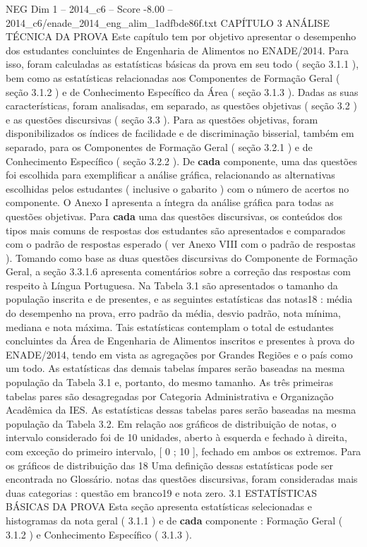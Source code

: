 \begin{textsample}{NEG Dim 1 – 2014\_c6 – Score -8.00 – 2014\_c6/enade\_2014\_eng\_alim\_1adfbde86f.txt}  \label{ex:f1_neg_020}
CAPÍTULO 3 ANÁLISE TÉCNICA DA PROVA Este capítulo tem por objetivo apresentar o desempenho dos estudantes concluintes de Engenharia de Alimentos no ENADE/2014.
Para isso, foram calculadas as estatísticas básicas da prova em seu todo ( seção 3.1.1 ), bem como as estatísticas relacionadas aos Componentes de Formação Geral ( seção 3.1.2 ) e de Conhecimento Específico da Área ( seção 3.1.3 ).
Dadas as suas características, foram analisadas, em separado, as questões objetivas ( seção 3.2 ) e as questões discursivas ( seção 3.3 ).
Para as questões objetivas, foram disponibilizados os índices de facilidade e de discriminação bisserial, também em separado, para os Componentes de Formação Geral ( seção 3.2.1 ) e de Conhecimento Específico ( seção 3.2.2 ).
De \textbf{cada} componente, uma das questões foi escolhida para exemplificar a análise gráfica, relacionando as alternativas escolhidas pelos estudantes ( inclusive o gabarito ) com o número de acertos no componente.
O Anexo I apresenta a íntegra da análise gráfica para todas as questões objetivas.
Para \textbf{cada} uma das questões discursivas, os conteúdos dos tipos mais comuns de respostas dos estudantes são apresentados e comparados com o padrão de respostas esperado ( ver Anexo VIII com o padrão de respostas ).
Tomando como base as duas questões discursivas do Componente de Formação Geral, a seção 3.3.1.6 apresenta comentários sobre a correção das respostas com respeito à Língua Portuguesa.
Na Tabela 3.1 são apresentados o tamanho da população inscrita e de presentes, e as seguintes estatísticas das notas18 : média do desempenho na prova, erro padrão da média, desvio padrão, nota mínima, mediana e nota máxima.
Tais estatísticas contemplam o total de estudantes concluintes da Área de Engenharia de Alimentos inscritos e presentes à prova do ENADE/2014, tendo em vista as agregações por Grandes Regiões e o país como um todo.
As estatísticas das demais tabelas ímpares serão baseadas na mesma população da Tabela 3.1 e, portanto, do mesmo tamanho.
As três primeiras tabelas pares são desagregadas por Categoria Administrativa e Organização Acadêmica da IES.
As estatísticas dessas tabelas pares serão baseadas na mesma população da Tabela 3.2.
Em relação aos gráficos de distribuição de notas, o intervalo considerado foi de 10 unidades, aberto à esquerda e fechado à direita, com exceção do primeiro intervalo, [ 0 ; 10 ], fechado em ambos os extremos.
Para os gráficos de distribuição das 18 Uma definição dessas estatísticas pode ser encontrada no Glossário. notas das questões discursivas, foram consideradas mais duas categorias : questão em branco19 e nota zero. 3.1 ESTATÍSTICAS BÁSICAS DA PROVA Esta seção apresenta estatísticas selecionadas e histogramas da nota geral ( 3.1.1 ) e de \textbf{cada} componente : Formação Geral ( 3.1.2 ) e Conhecimento Específico ( 3.1.3 ).

\end{textsample}
